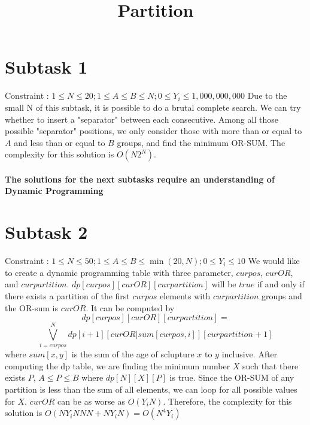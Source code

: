 \documentclass[a4paper,11pt]{article}
\title{Partition}
\begin{document}
\maketitle
\section{Subtask 1}
Constraint : $1\leq N \leq 20; 1 \leq A \leq B \leq N; 0 \leq Y_i \leq 1,000,000,000$\newline
Due to the small N of this subtask, it is possible to do a brutal complete search. We can try whether to insert a "separator" between each consecutive. Among all those possible "separator" positions, we only consider those with more than or equal to $A$ and less than or equal to $B$ groups, and find the minimum OR-SUM. The complexity for this solution is $O(N2^N)$.

\paragraph{The solutions for the next subtasks require an understanding of Dynamic Programming}
\section{Subtask 2}
Constraint : $1\leq N \leq 50; 1 \leq A \leq B \leq \min(20,N); 0 \leq Y_i \leq 10$\newline
We would like to create a dynamic programming table with three parameter, $curpos$, $curOR$, and $curpartition$. \newline
$dp[curpos][curOR][curpartition]$ will be $true$ if and only if there exists a partition of the first $curpos$ elements with $curpartition$ groups and the OR-sum is $curOR$. It can be computed by
\[dp[curpos][curOR][curpartition] =\]
\[\bigvee\limits_{i=curpos}^{N}dp[i+1][curOR | sum[curpos,i]][curpartition+1]\]
where $sum[x,y]$ is the sum of the age of sclupture $x$ to $y$ inclusive. \newline
After computing the dp table, we are finding the minimum number $X$ such that there exists $P$, $A \leq P \leq B$ where $dp[N][X][P]$ is true. Since the OR-SUM of any partition is less than the sum of all elements, we can loop for all possible values for $X$. $curOR$ can be as worse as $O(Y_iN)$. Therefore, the complexity for this solution is $O(NY_iNNN + NY_iN) = O(N^4Y_i)$
\end{document}
